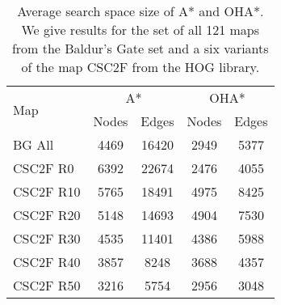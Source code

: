 \begin{table}
  \caption{Average search space size of A* and OHA*. 
We give results for the set of all 121 maps from the Baldur's Gate set 
and a six variants of the map CSC2F from the HOG library.}
  \label{table-graphsize}
  \centering
  \begin{tabular}{lcccc}
   \hline
  \multirow{2}{*}{Map} & \multicolumn{2}{c}{A*} & \multicolumn{2}{c}{OHA*} \\
	\cline{2-3}
	\cline{4-5}
	& Nodes & Edges & Nodes & Edges \\
\hline
BG All &  4469 & 16420 & 2949 &  5377 \\
CSC2F R0 & 6392 & 22674 & 2476 & 4055 \\
CSC2F R10 & 5765 & 18491 & 4975 & 8425 \\
CSC2F R20 & 5148 & 14693  & 4904 & 7530 \\ 
CSC2F R30 & 4535 & 11401 & 4386 & 5988 \\
CSC2F R40 & 3857 & 8248 & 3688 & 4357 \\
CSC2F R50 & 3216 & 5754 & 2956 & 3048 \\ 
   \hline
\end{tabular}
\end{table}

